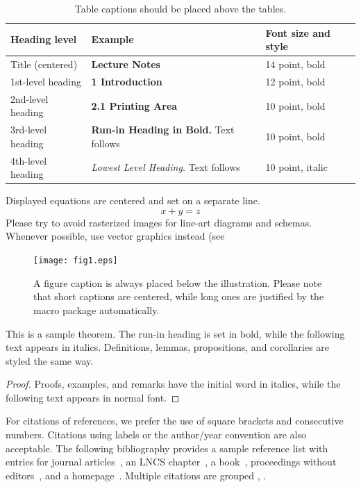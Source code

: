 \documentclass[runningheads]{llncs}
\begin{document}
\begin{table}
\caption{Table captions should be placed above the
tables.}\label{tab1}
\begin{tabular}{|l|l|l|}
\hline
Heading level &  Example & Font size and style\\
\hline
Title (centered) &  {\Large\bfseries Lecture Notes} & 14 point, bold\\
1st-level heading &  {\large\bfseries 1 Introduction} & 12 point, bold\\
2nd-level heading & {\bfseries 2.1 Printing Area} & 10 point, bold\\
3rd-level heading & {\bfseries Run-in Heading in Bold.} Text follows & 10 point, bold\\
4th-level heading & {\itshape Lowest Level Heading.} Text follows & 10 point, italic\\
\hline
\end{tabular}
\end{table}


\noindent Displayed equations are centered and set on a separate
line.
\begin{equation}
x + y = z
\end{equation}
Please try to avoid rasterized images for line-art diagrams and
schemas. Whenever possible, use vector graphics instead (see

\begin{figure}
\texttt{[image: fig1.eps]}
\caption{A figure caption is always placed below the illustration.
Please note that short captions are centered, while long ones are
justified by the macro package automatically.} \label{fig1}
\end{figure}

\begin{theorem}
This is a sample theorem. The run-in heading is set in bold, while
the following text appears in italics. Definitions, lemmas,
propositions, and corollaries are styled the same way.
\end{theorem}
%
%
\begin{proof}
Proofs, examples, and remarks have the initial word in italics,
while the following text appears in normal font.
\end{proof}
For citations of references, we prefer the use of square brackets
and consecutive numbers. Citations using labels or the author/year
convention are also acceptable. The following bibliography provides
a sample reference list with entries for journal
articles~\cite{ref_article1}, an LNCS chapter~\cite{ref_lncs1}, a
book~\cite{ref_book1}, proceedings without editors~\cite{ref_proc1},
and a homepage~\cite{ref_url1}. Multiple citations are grouped
\cite{ref_article1,ref_lncs1,ref_book1},
\cite{ref_article1,ref_book1,ref_proc1,ref_url1}.
\end{document}
